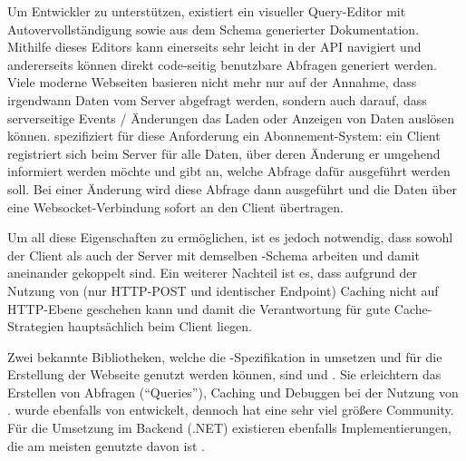 

Um Entwickler zu unterstützen, existiert ein visueller Query-Editor  mit Autovervollständigung sowie aus dem Schema generierter Dokumentation. Mithilfe dieses Editors kann einerseits sehr leicht in der API navigiert und andererseits können direkt code-seitig benutzbare Abfragen generiert werden.
Viele moderne Webseiten basieren nicht mehr nur auf der Annahme, dass irgendwann Daten vom Server abgefragt werden, sondern auch darauf, dass serverseitige Events / Änderungen das Laden oder Anzeigen von Daten auslösen können.  spezifiziert für diese Anforderung ein Abonnement-System: ein Client registriert sich beim Server für alle Daten, über deren Änderung er umgehend informiert werden möchte und gibt an, welche Abfrage dafür ausgeführt werden soll. Bei einer Änderung wird diese Abfrage dann ausgeführt und die Daten über eine Websocket-Verbindung sofort an den Client übertragen.

Um all diese Eigenschaften zu ermöglichen, ist es jedoch notwendig, dass sowohl der Client als auch der Server mit demselben -Schema arbeiten und damit aneinander gekoppelt sind.
Ein weiterer Nachteil ist es, dass aufgrund der Nutzung von  (nur HTTP-POST und identischer Endpoint) Caching nicht auf HTTP-Ebene geschehen kann und damit die Verantwortung für gute Cache-Strategien hauptsächlich beim Client liegen.

Zwei bekannte Bibliotheken, welche die -Spezifikation in  umsetzen und für die Erstellung der Webseite genutzt werden können, sind  und . Sie erleichtern das Erstellen von Abfragen (\enquote{Queries}), Caching und Debuggen bei der Nutzung von \@.  wurde ebenfalls von  entwickelt, dennoch hat  eine sehr viel größere Community. Für die Umsetzung im Backend (.NET) existieren ebenfalls Implementierungen, die am meisten genutzte davon ist .


